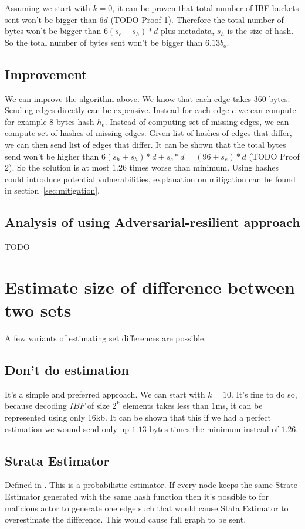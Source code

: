 \documentclass[11pt]{article}
\begin{document}
Assuming we start with $k=0$, it can be proven that total number of IBF buckets sent won't be bigger than $6d$  (TODO Proof 1).
Therefore the total number of bytes won't be bigger than $6(s_e+s_h)*d$ plus metadata, $s_h$ is the size of hash.
So the total number of bytes sent won't be bigger than $6.13b_o$.
\subsection{Improvement}
We can improve the algorithm above.
We know that each edge takes 360 bytes.
Sending edges directly can be expensive.
Instead for each edge $e$ we can compute for example 8 bytes hash $h_e$.
Instead of computing set of missing edges, we can compute set of hashes of missing edges.
Given list of hashes of edges that differ, we can then send list of edges that differ.
It can be shown that the total bytes send won't be higher than $6(s_h+s_h)*d + s_e * d = (96+s_e)*d$ (TODO Proof 2).
So the solution is at most $1.26$ times worse than minimum.
Using hashes could introduce potential vulnerabilities, explanation on mitigation can be found in section~\ref{sec:mitigation}.

\subsection{Analysis of using Adversarial-resilient approach}
TODO

\section{Estimate size of difference between two sets}\label{sec:estimate}
A few variants of estimating set differences are possible.
\subsection{Don't do estimation}
It's a simple and preferred approach.
We can start with $k = 10$.
It's fine to do so, because decoding $IBF$ of size $2^k$ elements takes less than 1ms, it can be represented using only 16kb.
It can be shown that this if we had a perfect estimation we wound send only up $1.13$ bytes times the minimum instead of $1.26$.

\subsection{Strata Estimator}
Defined in \cite{esrwpc}.
This is a probabilistic estimator.
If every node keeps the same Strate Estimator generated with the same hash function then it's possible to for malicious actor to generate one edge such that would cause Stata Estimator to overestimate the difference. This would cause full graph to be sent.
\end{document}
